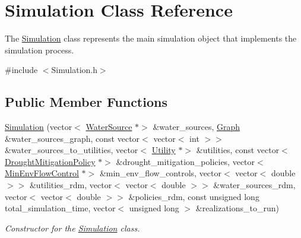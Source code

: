 \hypertarget{classSimulation}{}\section{Simulation Class Reference}
\label{classSimulation}


The {\ttfamily \mbox{\hyperlink{classSimulation}{Simulation}}} class represents the main simulation object that implements the simulation process.  




{\ttfamily \#include $<$Simulation.\+h$>$}

\subsection*{Public Member Functions}
\begin{DoxyCompactItemize}
\item 
\mbox{\hyperlink{classSimulation_ac9b9db9c3de5f9ff33f6ea89e2435c87}{Simulation}} (vector$<$ \mbox{\hyperlink{classWaterSource}{Water\+Source}} $\ast$$>$ \&water\+\_\+sources, \mbox{\hyperlink{classGraph}{Graph}} \&water\+\_\+sources\+\_\+graph, const vector$<$ vector$<$ int $>$$>$ \&water\+\_\+sources\+\_\+to\+\_\+utilities, vector$<$ \mbox{\hyperlink{classUtility}{Utility}} $\ast$$>$ \&utilities, const vector$<$ \mbox{\hyperlink{classDroughtMitigationPolicy}{Drought\+Mitigation\+Policy}} $\ast$$>$ \&drought\+\_\+mitigation\+\_\+policies, vector$<$ \mbox{\hyperlink{classMinEnvFlowControl}{Min\+Env\+Flow\+Control}} $\ast$$>$ \&min\+\_\+env\+\_\+flow\+\_\+controls, vector$<$ vector$<$ double $>$$>$ \&utilities\+\_\+rdm, vector$<$ vector$<$ double $>$$>$ \&water\+\_\+sources\+\_\+rdm, vector$<$ vector$<$ double $>$$>$ \&policies\+\_\+rdm, const unsigned long total\+\_\+simulation\+\_\+time, vector$<$ unsigned long $>$ \&realizations\+\_\+to\+\_\+run)
\begin{DoxyCompactList}\small\item\em Constructor for the \mbox{\hyperlink{classSimulation}{Simulation}} class. \end{DoxyCompactList}\item 

\end{DoxyCompactItemize}
